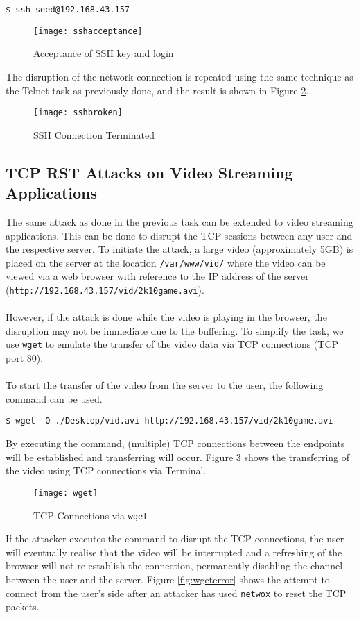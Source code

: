 \documentclass[a4paper,12pt]{article}
\begin{document}
\begin{verbatim}
$ ssh seed@192.168.43.157
\end{verbatim}
\begin{figure}[H]
	\centering
	\texttt{[image: sshacceptance]}
	\caption{Acceptance of SSH key and login}
	\label{fig:sshacceptance}
\end{figure}
The disruption of the network connection is repeated using the same technique as the Telnet task as previously done, and the result is shown in Figure \ref{fig:sshbroken}.
\begin{figure}[H]
	\centering
	\texttt{[image: sshbroken]}
	\caption{SSH Connection Terminated}
	\label{fig:sshbroken}
\end{figure}
\subsection{TCP RST Attacks on Video Streaming Applications}
\begin{par} The same attack as done in the previous task can be extended to video streaming applications. This can be done to disrupt the TCP sessions between any user and the respective server. To initiate the attack, a large video (approximately 5GB) is placed on the server at the location \texttt{/var/www/vid/} where the video can be viewed via a web browser with reference to the IP address of the server (\texttt{http://192.168.43.157/vid/2k10game.avi}).\\\\However, if the attack is done while the video is playing in the browser, the disruption may not be immediate due to the buffering. To simplify the task, we use \texttt{wget} to emulate the transfer of the video data via TCP connections (TCP port 80).\\\\To start the transfer of the video from the server to the user, the following command can be used.
	\end{par}
\begin{Verbatim}
$ wget -O ./Desktop/vid.avi http://192.168.43.157/vid/2k10game.avi
\end{Verbatim}
By executing the command, (multiple) TCP connections between the endpoints will be established and transferring will occur. Figure \ref{fig:wget} shows the transferring of the video using TCP connections via Terminal.

\begin{figure}[H]
	\centering
	\texttt{[image: wget]}
	\caption{TCP Connections via \texttt{wget}}
	\label{fig:wget}
\end{figure}
\noindent If the attacker executes the command to disrupt the TCP connections, the user will eventually realise that the video will be interrupted and a refreshing of the browser will not re-establish the connection, permanently disabling the channel between the user and the server. Figure \ref{fig:wgeterror} shows the attempt to connect from the user's side after an attacker has used \texttt{netwox} to reset the TCP packets.
\end{document}

